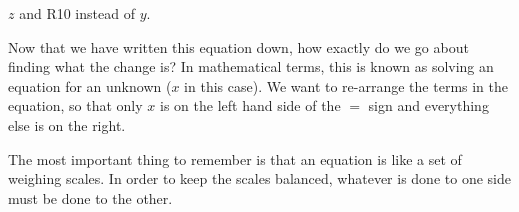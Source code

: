 $z$ and R10 instead of $y$.\par 
      \label{m38346*uid36}\nopagebreak\noindent{}
      \label{m38346*id176098}Now that we have written this equation down, how exactly do we go about finding
what the change is? In mathematical terms, this is known as solving an equation
for an unknown ($x$ in this case). We want to re-arrange the terms in the
equation, so that only $x$ is on the left hand side of the $=$ sign and
everything else is on the right.\par 
      \label{m38346*id176132}The most important thing to remember is that an equation is like a set of
weighing scales. In order to keep the scales balanced, whatever is done to one
side must be done to the other.\par 
    \setcounter{subfigure}{0}
